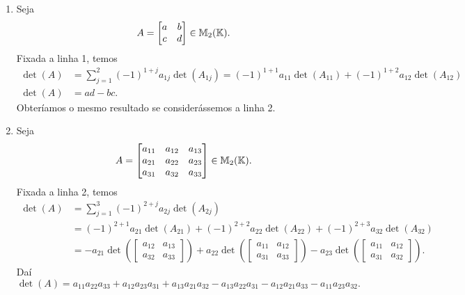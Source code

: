 \begin{exemplo}
    \begin{enumerate}[label={\arabic*})]
        \item Seja
        \[
            A =
            \begin{bmatrix}
                a & b\\
                c & d
            \end{bmatrix} \in \mathbb{M}_2(\mathbb{K}).
        \]
        Fixada a linha 1, temos
        \begin{align*}
            \det(A) &= \sum_{j = 1}^2(-1)^{1 + j}a_{1j}\det(A_{1j}) = (-1)^{1 + 1}a_{11}\det(A_{11}) + (-1)^{1 + 2}a_{12}\det(A_{12})\\
            \det(A) &= ad - bc.
        \end{align*}
        Obteríamos o mesmo resultado se considerássemos a linha 2.

        \item Seja
        \[
            A =
            \begin{bmatrix}
                a_{11} & a_{12} & a_{13}\\
                a_{21} & a_{22} & a_{23}\\
                a_{31} & a_{32} & a_{33}
            \end{bmatrix} \in \mathbb{M}_2(\mathbb{K}).
        \]
        Fixada a linha 2, temos
        \begin{align*}
            \det(A) &= \sum_{j = 1}^3(-1)^{2 + j}a_{2j}\det(A_{2j}) \\ &= (-1)^{2 + 1}a_{21}\det(A_{21}) + (-1)^{2 + 2}a_{22}\det(A_{22})
            + (-1)^{2 + 3}a_{32}\det(A_{32})\\ &= -a_{21}\det\left(\begin{bmatrix}a_{12} & a_{13}\\a_{32} & a_{33}\end{bmatrix}\right) +
            a_{22}\det\left(\begin{bmatrix}a_{11} & a_{12}\\a_{31} & a_{33}\end{bmatrix}\right) - a_{23}\det\left(\begin{bmatrix}a_{11} &
        a_{12}\\a_{31} & a_{32}\end{bmatrix}\right).
        \end{align*}
        Daí
        \[
            \det(A) = a_{11}a_{22}a_{33} + a_{12}a_{23}a_{31} + a_{13}a_{21}a_{32} - a_{13}a_{22}a_{31} - a_{12}a_{21}a_{33} -
            a_{11}a_{23}a_{32}.
        \]


\end{enumerate}
\end{exemplo}

